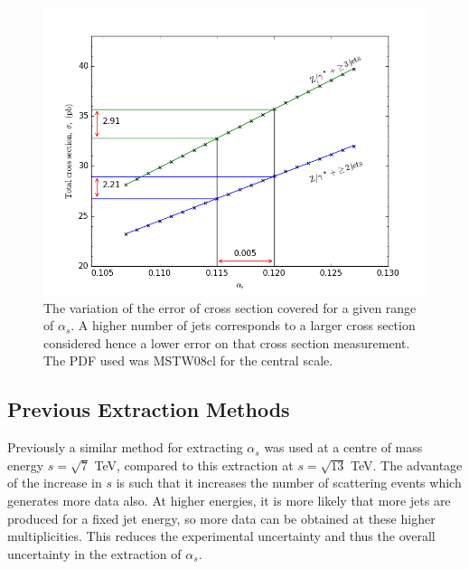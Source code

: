 \documentclass[12pt, onecolumn, nofootinbib]{revtex4}    %
\begin{document}
\begin{figure} 
	\begin{center}
		\includegraphics[width=1 \textwidth]{2jetvs3jet_totxsection.png}
		\caption{The variation of the error of cross section covered for a given range of ${\alpha_s}$. A higher number of jets corresponds to a larger cross section considered hence a lower error on that cross section measurement. The PDF used was MSTW08cl for the central scale. }
		\label{2jetvs3jet
		}
	\end{center}
\end{figure}

\subsection{Previous Extraction Methods}
Previously a similar method for extracting ${\alpha_s}$ was used at a centre of mass energy ${s = \sqrt{7}}$ TeV, compared to this extraction at ${s = \sqrt{13}}$ TeV. The advantage of the increase in ${s}$ is such that it increases the number of scattering events which generates more data also. At higher energies, it is more likely that more jets are produced for a fixed jet energy, so more data can be obtained at these higher multiplicities. This reduces the experimental uncertainty and thus the overall uncertainty in the extraction of ${\alpha_s}$. 
\end{document}
